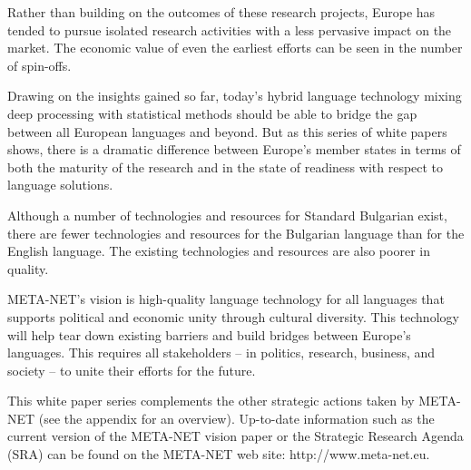 \begin{multicols}{2}
  Rather than building on the outcomes of these research projects, Europe has tended to pursue isolated research activities with a less pervasive impact on the market. The economic value of even the earliest efforts can be seen in the number of spin-offs. 


  Drawing on the insights gained so far, today’s hybrid language technology mixing deep processing with statistical methods should be able to bridge the gap between all European languages and beyond. But as this series of white papers shows, there is a dramatic difference between Europe’s
  member states in terms of both the maturity of the research and in the state of readiness with respect to language solutions.

  Although a number of technologies and resources for Standard Bulgarian exist, there are fewer technologies and resources for the Bulgarian language than for the English language. The existing technologies and resources are also poorer in quality.

  META-NET’s vision is high-quality language technology for all languages that supports political and economic unity through cultural diversity. This technology will help tear down existing barriers and build bridges between Europe’s languages. This requires all stakeholders -- in politics, research, business, and society -- to unite their efforts for the future.

  This white paper series complements the other strategic actions taken by META-NET (see the appendix for an overview). Up-to-date information such as the current version of the META-NET vision paper \cite{Meta1} or the Strategic Research Agenda (SRA) can be found on the META-NET web site: http://www.meta-net.eu.
  \end{multicols}

  \clearpage



